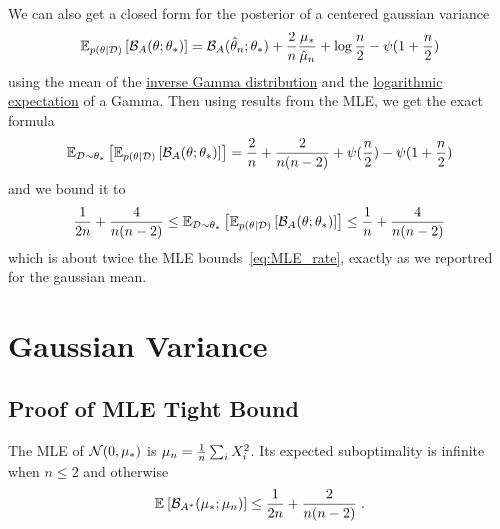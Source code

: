 \documentclass{article}
\newcommand*{\expect}[2][]{\ensuremath{\mathbb{E}_{#1} \left[ #2 \right] }} %
\newcommand{\logpart}{A}
\newcommand{\bregman}{\cB_\logpart}
\newcommand{\bregmanconj}{\cB_{\logpart^*}}
\newcommand{\nat}{\theta}
\begin{document}
\begin{example}
	We can also get a closed form for the posterior of a centered gaussian variance 
	\begin{align}
		\expect[p(\nat|\cD)]{\bregman(\nat ; \nat_*)} = \bregman(\hat \nat_n ; \nat_*) + \frac{2}{n} \frac{\mu_*}{\hat \mu_n} + \log\frac{n}{2} - \psi(1 + \frac{n}{2})
	\end{align}
	using the mean of the \href{https://en.wikipedia.org/wiki/Inverse-gamma_distribution}{inverse Gamma distribution} and the \href{https://en.wikipedia.org/wiki/Gamma_distribution#Logarithmic_expectation_and_variance}{logarithmic expectation} of a Gamma. 
	Then using results from the MLE, we get the exact formula
	\begin{align}
		\expect[\cD\sim\nat_*]{\expect[p(\nat|\cD)]{\bregman(\nat ; \nat_*)}}
		= \frac{2}{n} + \frac{2}{n(n-2)} + \psi(\half[n]) - \psi(1+ \half[n])
	\end{align}
	and we bound it to 
	\begin{align}
		\inv{2n} + \frac{4}{n(n-2)}
		\leq \expect[\cD\sim\nat_*]{\expect[p(\nat|\cD)]{\bregman(\nat ; \nat_*)}}
		\leq 
		\inv{n} + \frac{4}{n(n-2)}
	\end{align}
	which is about twice the MLE bounds~\eqref{eq:MLE_rate}, exactly as we reportred for the gaussian mean.
\end{example}


\section{Gaussian Variance}
\subsection{Proof of MLE Tight Bound}
	\begin{theorem}
	The MLE of ${\mathcal N}(0,\mu_*)$ is $\mu_n = \frac{1}{n} \sum_i X_i^2 $.
	Its expected suboptimality is infinite when $n\leq 2$ and otherwise
	\begin{align}
		 \expect{\bregmanconj( \mu_*; \mu_n) }
			\leq \inv{2n} +\frac{2}{n(n-2)} \; .
	\end{align}
	\end{theorem}
	
\end{document}
